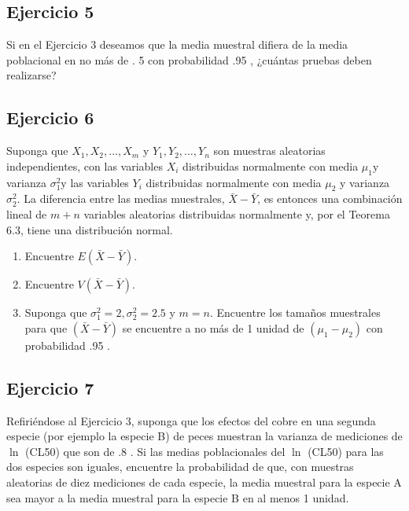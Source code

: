 \documentclass[
]{article}
\providecommand{\tightlist}{%
  \setlength{\itemsep}{0pt}\setlength{\parskip}{0pt}}
\begin{document}
\subsection{Ejercicio 5}\label{ejercicio-5-1}

Si en el Ejercicio 3 deseamos que la media muestral difiera de la media poblacional en no más de . 5 con probabilidad .95 , ¿cuántas pruebas deben realizarse?

\subsection{Ejercicio 6}\label{ejercicio-6-1}

Suponga que \(X_{1}, X_{2}, \ldots, X_{m}\) y \(Y_{1}, Y_{2}, \ldots, Y_{n}\) son muestras aleatorias independientes, con las variables \(X_{i}\) distribuidas normalmente con media \(\mu_{1} \mathrm{y}\) varianza \(\sigma_{1}^{2} \mathrm{y}\) las variables \(Y_{i}\) distribuidas normalmente con media \(\mu_{2}\) y varianza \(\sigma_{2}^{2}\). La diferencia entre las medias muestrales, \(\bar{X}-\bar{Y}\), es entonces una combinación lineal de \(m+n\) variables aleatorias distribuidas normalmente y, por el Teorema 6.3, tiene una distribución normal.

\begin{enumerate}
\def\labelenumi{\alph{enumi}.}
\tightlist
\item
  Encuentre \(E(\bar{X}-\bar{Y})\).
\item
  Encuentre \(V(\bar{X}-\bar{Y})\).
\item
  Suponga que \(\sigma_{1}^{2}=2, \sigma_{2}^{2}=2.5\) y \(m=n\). Encuentre los tamaños muestrales para que \((\bar{X}-\bar{Y})\) se encuentre a no más de 1 unidad de \(\left(\mu_{1}-\mu_{2}\right)\) con probabilidad .95 .
\end{enumerate}

\subsection{Ejercicio 7}\label{ejercicio-7-1}

Refiriéndose al Ejercicio 3, suponga que los efectos del cobre en una segunda especie (por ejemplo la especie B) de peces muestran la varianza de mediciones de \(\ln\) (CL50) que son de .8 . Si las medias poblacionales del \(\ln\) (CL50) para las dos especies son iguales, encuentre la probabilidad de que, con muestras aleatorias de diez mediciones de cada especie, la media muestral para la especie A sea mayor a la media muestral para la especie B en al menos 1 unidad.
\end{document}
